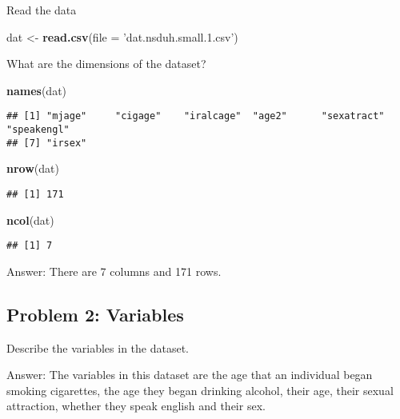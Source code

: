 \documentclass[
]{article}
\newenvironment{Shaded}{\begin{snugshade}}{\end{snugshade}}
\newcommand{\DataTypeTok}[1]{\textcolor[rgb]{0.13,0.29,0.53}{#1}}
\newcommand{\KeywordTok}[1]{\textcolor[rgb]{0.13,0.29,0.53}{\textbf{#1}}}
\newcommand{\NormalTok}[1]{#1}
\newcommand{\StringTok}[1]{\textcolor[rgb]{0.31,0.60,0.02}{#1}}
\begin{document}
Read the data

\begin{Shaded}
\begin{Highlighting}[]
\NormalTok{dat <-}\StringTok{ }\KeywordTok{read.csv}\NormalTok{(}\DataTypeTok{file =} \StringTok{'dat.nsduh.small.1.csv'}\NormalTok{)}
\end{Highlighting}
\end{Shaded}

What are the dimensions of the dataset?

\begin{Shaded}
\begin{Highlighting}[]
\KeywordTok{names}\NormalTok{(dat)}
\end{Highlighting}
\end{Shaded}

\begin{verbatim}
## [1] "mjage"     "cigage"    "iralcage"  "age2"      "sexatract" "speakengl"
## [7] "irsex"
\end{verbatim}

\begin{Shaded}
\begin{Highlighting}[]
\KeywordTok{nrow}\NormalTok{(dat)}
\end{Highlighting}
\end{Shaded}

\begin{verbatim}
## [1] 171
\end{verbatim}

\begin{Shaded}
\begin{Highlighting}[]
\KeywordTok{ncol}\NormalTok{(dat) }
\end{Highlighting}
\end{Shaded}

\begin{verbatim}
## [1] 7
\end{verbatim}

Answer: There are 7 columns and 171 rows.

\hypertarget{problem-2-variables}{%
\subsection{Problem 2: Variables}\label{problem-2-variables}}

Describe the variables in the dataset.

Answer: The variables in this dataset are the age that an individual
began smoking cigarettes, the age they began drinking alcohol, their
age, their sexual attraction, whether they speak english and their sex.
\end{document}
